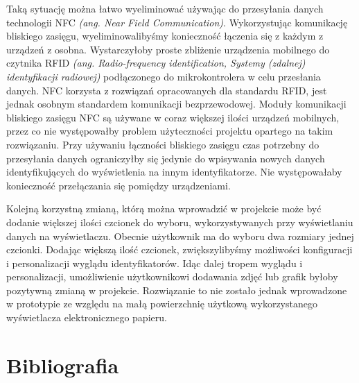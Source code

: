 \documentclass[a4paper,12pt, twoside]{article}
\begin{document}
        Taką sytuację można łatwo wyeliminować używając do przesyłania danych technologii NFC \textit{(ang. Near Field Communication)}. Wykorzystując komunikację bliskiego zasięgu, wyeliminowalibyśmy konieczność łączenia się z każdym z urządzeń z osobna. Wystarczyłoby proste zbliżenie urządzenia mobilnego do czytnika RFID \textit{(ang. Radio-frequency identification, Systemy (zdalnej) identyfikacji radiowej)} podłączonego do mikrokontrolera w celu przesłania danych. NFC korzysta z rozwiązań opracowanych dla standardu RFID, jest jednak osobnym standardem komunikacji bezprzewodowej. Moduły komunikacji bliskiego zasięgu NFC są używane w coraz większej ilości urządzeń mobilnych, przez co nie występowałby problem użyteczności projektu opartego na takim rozwiązaniu. Przy używaniu łączności bliskiego zasięgu czas potrzebny do przesyłania danych ograniczyłby się jedynie do wpisywania nowych danych identyfikujących do wyświetlenia na innym identyfikatorze. Nie występowałaby konieczność przełączania się pomiędzy urządzeniami.
        
        Kolejną korzystną zmianą, którą można wprowadzić w projekcie może być dodanie większej ilości czcionek do wyboru, wykorzystywanych przy wyświetlaniu danych na wyświetlaczu. Obecnie użytkownik ma do wyboru dwa rozmiary jednej czcionki. Dodając większą ilość czcionek, zwiększylibyśmy możliwości konfiguracji i personalizacji wyglądu identyfikatorów. Idąc dalej tropem wyglądu i personalizacji, umożliwienie użytkownikowi dodawania zdjęć lub grafik byłoby pozytywną zmianą w projekcie. Rozwiązanie to nie zostało jednak wprowadzone w prototypie ze względu na małą powierzchnię użytkową wykorzystanego wyświetlacza elektronicznego papieru.
        
    	\newpage
    	\section{Bibliografia}
    	
\end{document}
